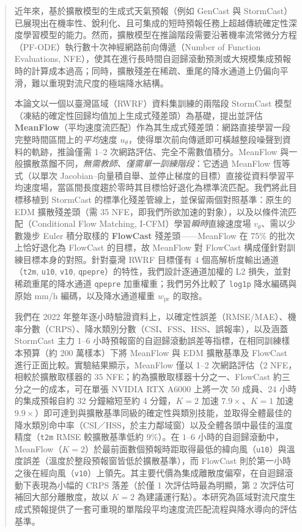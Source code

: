
\begin{abstract}

近年來，基於擴散模型的生成式天氣預報（例如 GenCast 與 StormCast）已展現出在機率性、銳利化、且可集成的短時預報任務上超越傳統確定性深度學習模型的能力。然而，擴散模型在推論階段需要沿著機率流常微分方程（PF-ODE）執行數十次神經網路前向傳遞（Number of Function Evaluations, NFE），使其在進行長時間自迴歸滾動預測或大規模集成預報時的計算成本過高；同時，擴散殘差在稀疏、重尾的降水通道上仍偏向平滑，難以重現對流尺度的極端降水結構。

本論文以一個以臺灣區域（RWRF）資料集訓練的兩階段 StormCast 模型（凍結的確定性回歸均值加上生成式殘差頭）為基礎，提出並評估 \textbf{MeanFlow}（平均速度流匹配）作為其生成式殘差頭：網路直接學習一段完整時間區間上的\emph{平均}速度 $u_\theta$，使得單次前向傳遞即可橫越整段噪聲到資料的軌跡，推論僅需 1--2 次網路評估、完全不需數值積分。MeanFlow 與一般擴散蒸餾不同，\emph{無需教師、僅需單一訓練階段}：它透過 MeanFlow 恆等式（以單次 Jacobian--向量積自舉、並停止梯度的目標）直接從資料學習平均速度場，當區間長度趨於零時其目標恰好退化為標準流匹配。我們將此目標移植到 StormCast 的標準化殘差管線上，並保留兩個對照基準：原生的 EDM 擴散殘差頭（需 35 NFE，即我們所欲加速的對象），以及以條件流匹配（Conditional Flow Matching, I-CFM）學習\emph{瞬時}直線速度場 $v_\theta$、需以少數幾步 Euler 積分取樣的 \textbf{FlowCast} 殘差頭——MeanFlow 在 75\% 的批次上恰好退化為 FlowCast 的目標，故 MeanFlow 對 FlowCast 構成僅針對訓練目標本身的對照。針對臺灣 RWRF 目標僅有 4 個高解析度輸出通道（\texttt{t2m}, \texttt{u10}, \texttt{v10}, \texttt{qpepre}）的特性，我們設計逐通道加權的 L2 損失，並對稀疏重尾的降水通道 \texttt{qpepre} 加重權重；我們另外比較了 \texttt{log1p} 降水編碼與原始 mm/h 編碼，以及降水通道權重 $w_{\text{pr}}$ 的取捨。

我們在 2022 年整年逐小時驗證資料上，以確定性誤差（RMSE/MAE）、機率分數（CRPS）、降水類別分數（CSI、FSS、HSS、誤報率），以及涵蓋 StormCast 主力 $1$--$6$ 小時預報窗的自迴歸滾動誤差等指標，在相同訓練樣本預算（約 200 萬樣本）下將 MeanFlow 與 EDM 擴散基準及 FlowCast 進行正面比較。實驗結果顯示，MeanFlow 僅以 1--2 次網路評估（$2$ NFE，相較於擴散取樣器的 $35$ NFE；約為擴散取樣器十分之一、FlowCast 約三分之一的成本，可在單張 NVIDIA RTX A6000 上將一次 50 成員、24 小時的集成預報自約 32 分鐘縮短至約 4 分鐘，$K=2$ 加速 $7.9\times$、$K=1$ 加速 $9.9\times$）即可達到與擴散基準同級的確定性與類別技能，並取得全體最佳的降水類別命中率（CSI／HSS，於主力鄰域窗）以及全體各頭中最佳的溫度精度（\texttt{t2m} RMSE 較擴散基準低約 $9\%$）。在 $1$--$6$ 小時的自迴歸滾動中，MeanFlow（$K=2$）於最前面數個預報時距取得最低的緯向風（\texttt{u10}）與溫度誤差（溫度於整段預報窗皆低於擴散基準），而 FlowCast 則於第一小時之後在經向風（\texttt{v10}）上領先。其主要代價為集成離散度偏窄，在自迴歸滾動下表現為小幅的 CRPS 落差（於僅 1 次評估時最為明顯，第 2 次評估可補回大部分離散度，故以 $K=2$ 為建議運行點）。本研究為區域對流尺度生成式預報提供了一套可重現的單階段平均速度流匹配流程與降水導向的評估基準。

\end{abstract}

